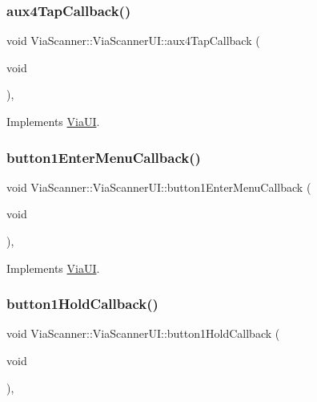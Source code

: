 \subsubsection{\texorpdfstring{aux4\+Tap\+Callback()}{aux4TapCallback()}}
{\footnotesize\ttfamily void Via\+Scanner\+::\+Via\+Scanner\+U\+I\+::aux4\+Tap\+Callback (\begin{DoxyParamCaption}\item[{void}]{ }\end{DoxyParamCaption})\hspace{0.3cm}{\ttfamily [override]}, {\ttfamily [virtual]}}



Implements \mbox{\hyperlink{class_via_u_i_a0a43c527f027d11b266080d8cacb1d65}{Via\+UI}}.

\mbox{\label{class_via_scanner_1_1_via_scanner_u_i_a10b9a54f4fb6ea88203d53041093d650}} 
\subsubsection{\texorpdfstring{button1\+Enter\+Menu\+Callback()}{button1EnterMenuCallback()}}
{\footnotesize\ttfamily void Via\+Scanner\+::\+Via\+Scanner\+U\+I\+::button1\+Enter\+Menu\+Callback (\begin{DoxyParamCaption}\item[{void}]{ }\end{DoxyParamCaption})\hspace{0.3cm}{\ttfamily [override]}, {\ttfamily [virtual]}}



Implements \mbox{\hyperlink{class_via_u_i_ae00249c10af94437c357222328a56f82}{Via\+UI}}.

\mbox{\label{class_via_scanner_1_1_via_scanner_u_i_a8d7608e430d6be2777f4fb76b4ea9f2b}} 
\subsubsection{\texorpdfstring{button1\+Hold\+Callback()}{button1HoldCallback()}}
{\footnotesize\ttfamily void Via\+Scanner\+::\+Via\+Scanner\+U\+I\+::button1\+Hold\+Callback (\begin{DoxyParamCaption}\item[{void}]{ }\end{DoxyParamCaption})\hspace{0.3cm}{\ttfamily [override]}, {\ttfamily [virtual]}}



